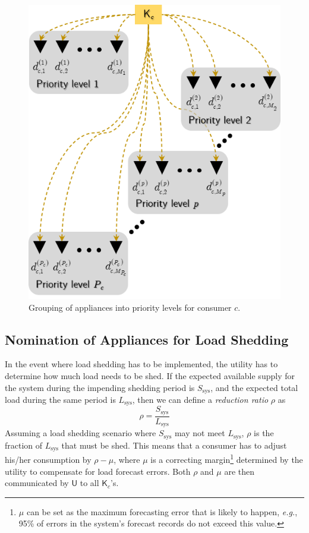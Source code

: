 \documentclass[journal, a4paper]{IEEEtran}
\begin{document}
\begin{figure}[t!]
	\centering
	\includegraphics[scale=0.75]{calols_consumer appliance prioritization.png}
	\caption{Grouping of appliances into priority levels for consumer $c$.}
	\label{fig: Appliance priority levels}
\end{figure}

\subsection{Nomination of Appliances for Load Shedding}
\label{subsec: I. Nomination of Appliances for Load Shedding}

In the event where load shedding has to be implemented, the utility has to determine how much load needs to be shed.
If the expected available supply for the system during the impending shedding period is $S_{\text{sys}}$,
and the expected total load during the same period is $L_{\text{sys}}$,
then we can define a \textit{reduction ratio} $\rho$ as
\begin{equation}
	\label{eqn: Reduction ratio}
	\rho = \frac{S_{\text{sys}}}{L_{\text{sys}}}
\end{equation}
Assuming a load shedding scenario where $S_{\text{sys}}$ may not meet $L_{\text{sys}}$,
$\rho$ is the fraction of $L_{\text{sys}}$ that must be shed.
This means that a consumer has to adjust his/her consumption by $\rho - \mu$,
where $\mu$ is a correcting margin\footnote{
$\mu$ can be set as the maximum forecasting error that is likely to happen,
\textit{e.g.}, 95\% of errors in the system's forecast records do not exceed this value.}
determined by the utility to compensate for load forecast errors.
Both $\rho$ and $\mu$ are then communicated by $\mathsf{U}$ to all $\mathsf{K}_{c}$'s.
\end{document}
